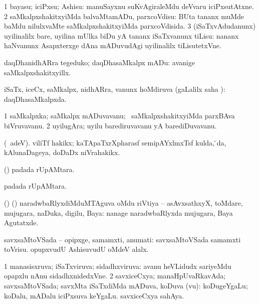 {{{{{{\bentry
{} 
\gl{\sakirx}
\bmng
\bnum
\num{1} bayasu; iciPxsu; Ashisu:  manuSayxnu suKvAgiraleMdu deVvaru iciPxsutAtxne. 
\num{2} saMkalpxshakitxyiMda balvaMtamADu, parxcoVdisu:  BUta tananx muMde baMdu nilulxvaMte saMkalpxshakitxyiMda parxcoVdisida. 
\num{3} (iSaTxvAdudanunx) uyilinalilx bare, uyilina mUlka biDu yA tananx iSaTxvanunx tiLisu:  nananx haNvanunx Asapxterxge dAna mADuvudAgi uyilinalilx tiLisutetxVne. 
\enum
\emng

\noindent 
\gl{\akirx}
\bmng
daqDhanidhARra tegeduko; daqDhasaMkalpx mADu:  avanige saMkalpxshakitxyillx. 
\emng
\eentry

\bentry
{}
  \gl{\gu}\bmng
iSaTx, iceCx, saMkalpx, nidhARra, \mo vanunx hoMdiruva (\saMpa gaLalilx saha \parx):  daqDhasaMkalpxda. 
\emng
\eentry

\bentry
{}
  \gl{\nA}\bmng
\bnum
\num{1} saMkalpxka; saMkalpx mADuvavanu; \kanmu\ saMkalpxshakitxyiMda parxBAva biVruvavanu. 
\num{2} uyilugAra; uyilu barediruvavanu yA barediDuvavanu. 
\enum
\emng
\eentry

\bentry
{}
  \gl{\nA}\bmng
(\bava\ adeV). viliTf hakikx; kaTApaTxrXpharasf semipAYxlmxTsf kulda, \u \ame da, kAlunaDageya, doDaDx niVrahakikx. 
\emng
\eentry

\bentry
{} 
\gl{\gu}
\expl{}
\bmng
(\ame)  padada rUpAMtara. 
\emng
\eentry

\bentry
{}
  \gl{\nA}\bmng
{} padada rUpAMtara. 
\emng
\eentry

\bentry
{}
  \gl{\nA}\bmng
(\bava) (\AmA) naradwbaRlyxdiMduMTAguva oMdu riVtiya -- asAvxsathxyX, toMdare, mujugara, naDuka, digilu, Baya:  nanage naradwbaRlyxda mujugara, Baya Agutatxde. 
\emng
\eentry

\bentry
{} 
\gl{\nA}
\expl{}
\bmng
savxsaMtoVSada -- opipxge, samamxti, anumati:  savxsaMtoVSada samamxti toVrisu.  opupxvudU AshisuvudU oMdeV alalx. 
\emng
\eentry

\bentry
{} 
\gl{\gu}
\bmng
\bnum
\num{1} manasisxruva; iSaTxviruva; sidadhxviruva:  avanu heVLidudx sariyeMdu opapxlu nAnu sidadhxnidedxVne. 
\num{2} savxiceCxya; manaHpUvaRkavAda; savxsaMtoVSada; savxMta iSaTxdiMda mADuva, koDuva (\mo vu):  koDugeYgaLu; koDalu, mADalu iciPxsuva keYgaLu.  savxiceCxya sahAya. 
\enum
\emng

}}}}}}
